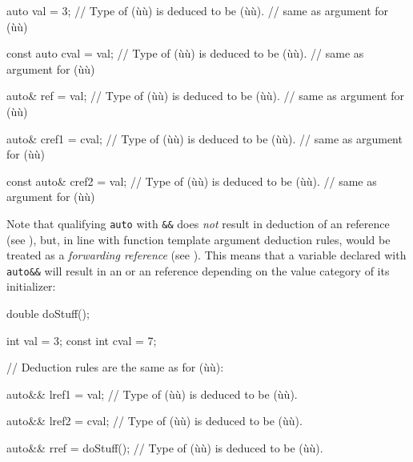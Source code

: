 \begin{emcppslisting}[language=C++]
auto val = 3;
    // Type of (ù{}ù) is deduced to be (ù{}ù).
    // same as argument for (ù{}ù)

const auto cval = val;
    // Type of (ù{}ù) is deduced to be (ù{}ù).
    // same as argument for (ù{}ù)

auto& ref = val;
    // Type of (ù{}ù) is deduced to be (ù{}ù).
    // same as argument for (ù{}ù)

auto& cref1 = cval;
    // Type of (ù{}ù) is deduced to be (ù{}ù).
    // same as argument for (ù{}ù)

const auto& cref2 = val;
    // Type of (ù{}ù) is deduced to be (ù{}ù).
    // same as argument for (ù{}ù)
\end{emcppslisting}
    
\noindent Note that qualifying \lstinline!auto! with \lstinline!&&!
does \emph{not} result in deduction of an  reference (see
), but, in line with function template
argument deduction rules, would be treated as a \emph{forwarding
reference} (see ). This means that a
variable declared with \lstinline!auto&&! will result in an  or an
 reference depending on the value category of its initializer:

\begin{emcppslisting}[language=C++]
double doStuff();

      int val  = 3;
const int cval = 7;

// Deduction rules are the same as for (ù{}ù):

auto&& lref1 = val;
    // Type of (ù{}ù) is deduced to be (ù{}ù).

auto&& lref2 = cval;
    // Type of (ù{}ù) is deduced to be (ù{}ù).

auto&& rref = doStuff();
    // Type of (ù{}ù) is deduced to be (ù{}ù).
\end{emcppslisting}
    
